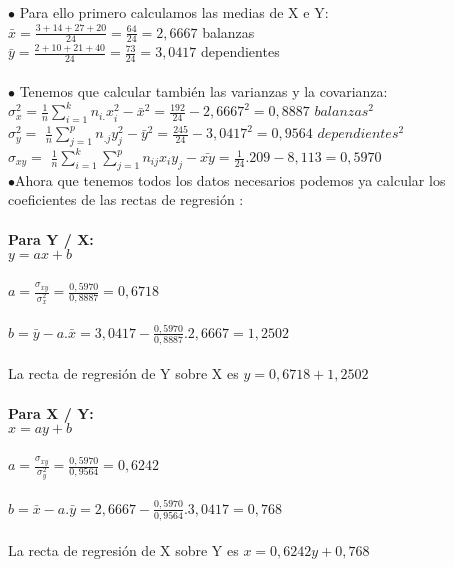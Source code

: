 \subproblem	
	$\bullet$ Para ello primero calculamos las medias de X e Y: \\
	
	$\bar{x} = \frac{3 + 14 + 27 +20}{24} = \frac{64}{24} = 2,6667 $ balanzas
	\\ 
	
	$\bar{y} = \frac{2 + 10+21 +40}{24} = \frac{73}{24} = 3,0417  $ dependientes
	\\
	\\
	
	$\bullet$ Tenemos que calcular también las varianzas y la covarianza: \\
	
	
	
	$\sigma_{x}^{2} =  $$\frac{1}{n}\sum^{k}_{i=1}n_{i.}x_{i}^{2} - \bar{x}^{2} = \frac{192}{24} - 2,6667^{2} = 0,8887 $ $ balanzas^{2} $ \\
	
	$\sigma_{y}^{2} = $ $\frac{1}{n}\sum^{p}_{j=1}n_{.j}y_{j}^{2} - \bar{y}^{2} = \frac{245}{24} - 3,0417 ^{2} = 0,9564 $ $dependientes^{2}$ \\
	
	$\sigma_{xy} = $ $\frac{1}{n}\sum^{k}_{i=1}\sum^{p}_{j=1}n_{ij}x_{i}y_{j} - \bar{xy}= \frac{1}{24}.209 - 8,113 = 0,5970 $ \\
	
	
	$\bullet$Ahora que tenemos todos los datos necesarios podemos ya calcular los coeficientes de las rectas de regresión :\\ \\
	\textbf{Para Y / X:}\\
	$y = ax +b $\\ \\
	$a = \frac{\sigma_{xy}}{\sigma_{x}^{2}} = \frac{0,5970}{0,8887} = 0,6718$\\ \\
	$b = \bar{y} - a.\bar{x} = 3,0417 - \frac{0,5970}{0,8887}. 2,6667 = 1,2502$\\ \\
	La recta de regresión de Y sobre X es
	$y = 0,6718 + 1,2502 $\\ \\
	\textbf{Para X / Y:}\\
	$x = ay + b $\\ \\
	$a = \frac{\sigma_{xy}}{\sigma_{y}^{2}} = \frac{0,5970}{ 0,9564 } = 0,6242$\\ \\
	$b = \bar{x} - a.\bar{y} = 2,6667 -  \frac{0,5970}{ 0,9564 }.3,0417 = 0,768$\\ \\La recta de regresión de X sobre Y es
	$x = 0,6242y +  0,768 $\\ 
\subproblem	
	
